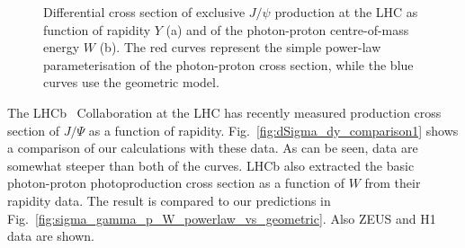 \documentclass[12pt]{article}
\begin{document}
\begin{figure}[!t]
  \centering
  \caption{Differential cross section of exclusive $J/\psi$ production at the LHC as function of rapidity $Y$ (a) and of the photon-proton centre-of-mass energy $W$ (b).
           The red curves represent the simple power-law parameterisation of the photon-proton cross section, while the blue curves use the geometric model.}
\end{figure}

The LHCb~\cite{LHCb1, LHCb2} Collaboration at the LHC has recently measured production cross section of $J/\Psi$ as a function of rapidity.
Fig.~\ref{fig:dSigma_dy_comparison1} shows a comparison of our calculations with these data.
As can be seen, data are somewhat steeper than both of the curves.
LHCb also extracted the basic photon-proton photoproduction cross section as a function of $W$ from their rapidity data.
The result is compared to our predictions in  Fig.~\ref{fig:sigma_gamma_p_W_powerlaw_vs_geometric}.
Also ZEUS and H1 data are shown.
\end{document}
